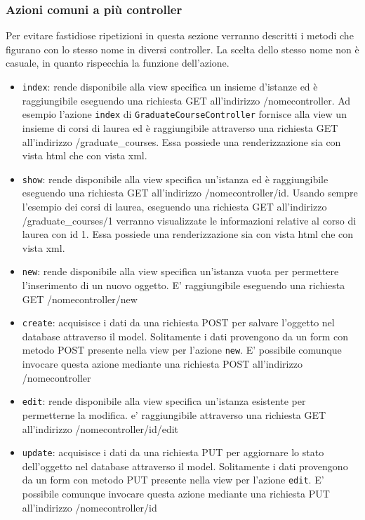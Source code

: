 \documentclass[11pt,a4paper]{article}
\begin{document}
\subsubsection{Azioni comuni a più controller}
Per evitare fastidiose ripetizioni in questa sezione verranno descritti i metodi che figurano con lo stesso nome in diversi controller. La scelta dello stesso nome non è casuale, in quanto rispecchia la funzione dell'azione.
\begin{itemize}
 \item \verb|index|: rende disponibile alla view specifica un insieme d'istanze ed è raggiungibile eseguendo una richiesta GET all'indirizzo /nomecontroller. Ad esempio l'azione \verb|index| di \verb|GraduateCourseController| fornisce alla view un insieme di corsi di laurea ed è raggiungibile attraverso una richiesta GET all'indirizzo /graduate\_courses. Essa possiede una renderizzazione sia con vista html che con vista xml.
 \item \verb|show|: rende disponibile alla view specifica un'istanza ed è raggiungibile eseguendo una richiesta GET all'indirizzo /nomecontroller/id. Usando sempre l'esempio dei corsi di laurea, eseguendo una richiesta GET all'indirizzo /graduate\_courses/1 verranno visualizzate le informazioni relative al corso di laurea con id 1. Essa possiede una renderizzazione sia con vista html che con vista xml.
 \item \verb|new|: rende disponibile alla view specifica un'istanza vuota per permettere l'inserimento di un nuovo oggetto. E' raggiungibile eseguendo una richiesta GET /nomecontroller/new
 \item \verb|create|: acquisisce i dati da una richiesta POST per salvare l'oggetto nel database attraverso il model. Solitamente i dati provengono da un form con metodo POST presente nella view per l'azione \verb|new|. E' possibile comunque invocare questa azione mediante una richiesta POST all'indirizzo /nomecontroller
 \item \verb|edit|: rende disponibile alla view specifica un'istanza esistente per permetterne la modifica. e' raggiungibile attraverso una richiesta GET all'indirizzo /nomecontroller/id/edit
 \item \verb|update|: acquisisce i dati da una richiesta PUT per aggiornare lo stato dell'oggetto nel database attraverso il model. Solitamente i dati provengono da un form con metodo PUT presente nella view per l'azione \verb|edit|. E' possibile comunque invocare questa azione mediante una richiesta PUT all'indirizzo /nomecontroller/id

\end{itemize}
\end{document}
